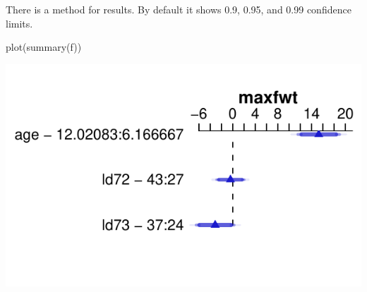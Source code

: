 There is a  method for  results.  By default it
shows 0.9, 0.95, and 0.99 confidence limits. \ipacue
\begin{Schunk}
\begin{Sinput}
plot(summary(f))
\end{Sinput}


\centerline{\includegraphics[width=\maxwidth]{rmsintro-unnamed-chunk-20-1} }

\end{Schunk}

